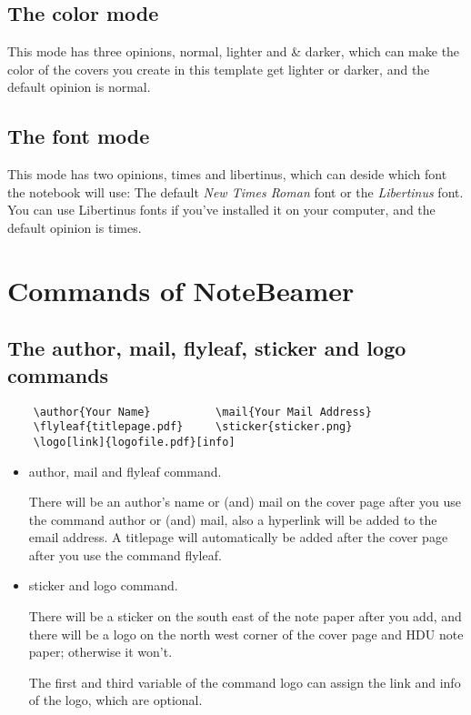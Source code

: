 \documentclass[11pt]{article}
\makeatletter
\def\@pkg#1{\texorpdfstring{\href{https://www.ctan.org/pkg/#1}{\textcolor{pkgcolor}{\textsf{#1}}}}{“#1”}}
\def\s@pkg#1{\texorpdfstring{\textcolor{pkgcolor}{\textsf{#1}}}{“#1”}}
\DeclareRobustCommand\pkg{\@ifstar\s@pkg\@pkg}
\def\mode#1{\texorpdfstring{\textcolor{moducolor}{\textsf{#1}}}{“#1”}}
\def\cmd#1{\texorpdfstring{\textcolor{cmdcolor}{\textsf{#1}}}{“#1”}}
\makeatother
\begin{document}
\subsection{The \mode{color} mode}
This mode has three opinions, \mode{normal}, \mode{lighter} and \& \mode{darker}, which can make the color of the covers you create in this template get lighter or darker, and the default opinion is \mode{normal}.

\subsection{The \mode{font} mode}
This mode has two opinions, \mode{times} and \mode{libertinus}, which can deside which font the notebook will use: The default \emph{New Times Roman} font or the \emph{Libertinus} font. You can use Libertinus fonts if you've installed it on your computer, and the default opinion is \mode{times}.

\section{Commands of \pkg{NoteBeamer}}

\subsection{The \cmd{author}, \cmd{mail}, \cmd{flyleaf}, \cmd{sticker} and \cmd{logo} commands}
\begin{verbatim}
    \author{Your Name}          \mail{Your Mail Address}
    \flyleaf{titlepage.pdf}     \sticker{sticker.png}
    \logo[link]{logofile.pdf}[info]
\end{verbatim}
\begin{itemize}
    \item \cmd{author}, \cmd{mail} and \cmd{flyleaf} command.
    
    There will be an author's name or (and) mail on the cover page after you use the command \cmd{author} or (and) \cmd{mail}, also a hyperlink will be added to the email address. A titlepage will automatically be added after the cover page after you use the command \cmd{flyleaf}.

    \item  \cmd{sticker} and \cmd{logo} command.
    
    There will be a sticker on the south east of the note paper after you add, and there will be a logo on the north west corner of the cover page and HDU note paper; otherwise it won't.

    The first and third variable of the command \cmd{logo} can assign the link and info of the logo, which are optional.
\end{itemize}
\end{document}
